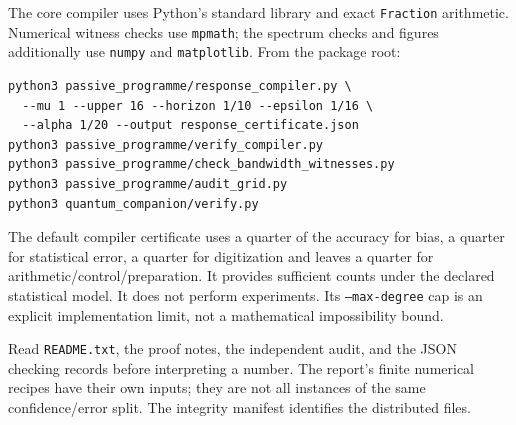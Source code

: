 \documentclass[11pt,a4paper]{article}
\begin{document}
The core compiler uses Python's standard library and exact \texttt{Fraction} arithmetic. Numerical witness checks use \texttt{mpmath}; the spectrum checks and figures additionally use \texttt{numpy} and \texttt{matplotlib}. From the package root:
\begin{verbatim}
python3 passive_programme/response_compiler.py \
  --mu 1 --upper 16 --horizon 1/10 --epsilon 1/16 \
  --alpha 1/20 --output response_certificate.json
python3 passive_programme/verify_compiler.py
python3 passive_programme/check_bandwidth_witnesses.py
python3 passive_programme/audit_grid.py
python3 quantum_companion/verify.py
\end{verbatim}
The default compiler certificate uses a quarter of the accuracy for bias, a quarter for statistical error, a quarter for digitization and leaves a quarter for arithmetic/control/preparation. It provides sufficient counts under the declared statistical model. It does not perform experiments. Its \texttt{--max-degree} cap is an explicit implementation limit, not a mathematical impossibility bound.

Read \texttt{README.txt}, the proof notes, the independent audit, and the JSON checking records before interpreting a number. The report's finite numerical recipes have their own inputs; they are not all instances of the same confidence/error split. The integrity manifest identifies the distributed files.
\end{document}
